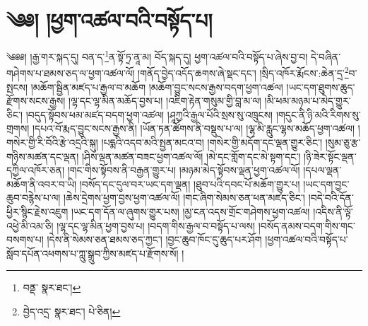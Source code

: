 \setcounter{footnote}{0} 
\chapter{༄༅། །ཕྱག་འཚལ་བའི་བསྟོད་པ།}༄༅༅། །རྒྱ་གར་སྐད་དུ། བན་ད་\footnote{བནྡ་  སྣར་ཐང་། }ན་སྟོ་ཏྲ་ནཱ་མ། བོད་སྐད་དུ། ཕྱག་འཚལ་བའི་བསྟོད་པ་ཞེས་བྱ་བ། དེ་བཞིན་གཤེགས་པ་ཐམས་ཅད་ལ་ཕྱག་འཚལ་ལོ། །གནོད་བྱེད་འདོད་ཆགས་ཞེ་སྡང་དང་། །སྲིད་འཁོར་རྨོངས་:ཆེན་དྲ་\footnote{བྱེད་འདྲ་  སྣར་ཐང་།  པེ་ཅིན། }བ་སྤངས། །མཆོག་སྦྱིན་མཛད་པ་རྒྱལ་བ་མཆོག །མཆོག་བྱུང་སངས་རྒྱས་བདག་ཕྱག་འཚལ། །ཡང་དག་ཐུགས་ཆུད་རྫོགས་སངས་རྒྱས། །ལྷ་དང་ལྷ་མིན་མཆོད་བྱས་པ། །འཇིག་རྟེན་གསུམ་གྱི་བླ་མ་ལ། །མི་ཕམ་མཉམ་པ་མེད་གྱུར་ཅིང་། །བདུད་སྟོབས་ཕམ་མཛད་བདག་ཕྱག་འཚལ། །ཤཱཀྱའི་རྒྱལ་པོའི་སྲས་སུ་འཁྲུངས། །གདུང་ནི་ཉི་མའི་རིགས་སུ་གྲགས། །དཔའ་བོ་རྨད་བྱུང་སངས་རྒྱས་ནི། །ཡོན་ཏན་ཚོགས་ནི་བསྡུས་པ་ལ། །ལྷ་མི་རླུང་ལྷས་མཆོད་ཕྱག་འཚལ། །གསེར་གྱི་རི་བོའི་རྩེ་འདྲའི་སྐུ། །པདྨའི་འདབ་མའི་སྤྱན་མངའ་བ། །གསེར་གྱི་མདོག་དང་ལྡན་གྱུར་ཅིང་། །སུམ་ཅུ་རྩ་གཉིས་མཚན་དང་ལྡན། །ཤིས་ལྡན་མཚན་བཟང་ཕྱག་འཚལ་ལོ། །མེ་དང་གློག་དང་མེ་སྟག་དང་། །ཉི་ཟེར་སྟོང་ལྡན་དཀྱིལ་འཁོར་ཅན། །གང་གིས་སྟོབས་ནི་བརྒྱན་གྱུར་པ། །མཉམ་མེད་སྟོབས་ལྡན་ཕྱག་འཚལ་ལོ། །དཔལ་ལྡན་མཆོག་ནི་འབར་བ་ཡི། །བསོད་དང་དུལ་བར་ཡང་དག་ལྡན། །ཐུབ་པའི་དབང་པོ་མཆོག་གྱུར་པ། །ཡང་དག་བྱང་ཆུབ་བརྙེས་པ་ལ། །ཆེས་དྲེགས་ཕྱག་བྱས་ཕྱག་འཚལ་ལོ། །གང་ཞིག་སེམས་ཅན་ཕན་མཛད་ཅིང་། །བདེ་བའི་དོན་ཕྱིར་སྙིང་རྗེས་འཇུག །ཡང་དག་དོན་ལ་ཞུགས་གྱུར་པས། །མྱ་ངན་འདས་གྲོང་གཤེགས་ཕྱག་འཚལ། །འདིས་ནི་ལྟོ་འཕྱེ་མི་འམ་ཅི། །ལྷ་དང་ལྷ་མིན་ཕྱག་བྱས་པ། །བདག་གིས་རྒྱལ་བ་བསྟོད་པ་ལས། །བསོད་ནམས་བདག་གིས་གང་བསགས་པ། །དེས་ནི་སེམས་ཅན་ཐམས་ཅད་ཀྱང་། །བྱང་ཆུབ་ཁོང་དུ་ཆུད་པར་ཤོག །ཕྱག་འཚལ་བའི་བསྟོད་པ་སློབ་དཔོན་འཕགས་པ་ཀླུ་སྒྲུབ་ཀྱིས་མཛད་པ་རྫོགས་སོ། ། 